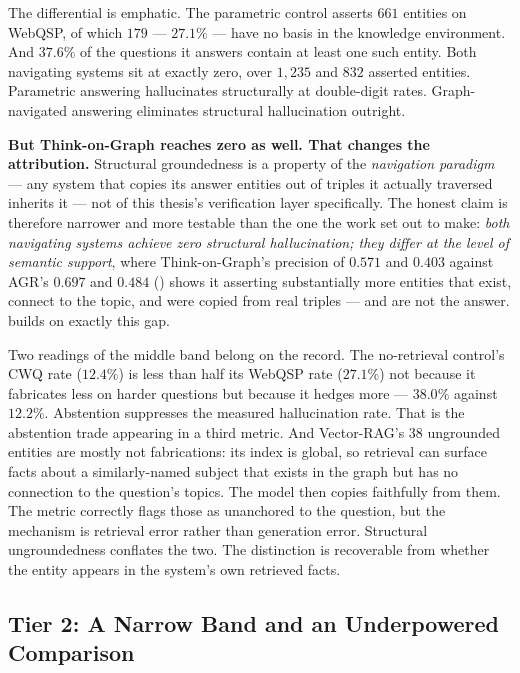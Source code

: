 The differential is emphatic. The parametric control asserts $661$ entities
on WebQSP, of which $179$ --- $27.1\%$
--- have no basis in the knowledge environment. And $37.6\%$ of the questions it
answers contain at least one such entity. Both navigating systems sit at exactly
zero, over $1{,}235$ and $832$ asserted entities. Parametric answering
hallucinates structurally at double-digit rates. Graph-navigated answering
eliminates structural hallucination outright.

\textbf{But Think-on-Graph reaches zero as well. That changes the
attribution.} Structural groundedness is a property of the \emph{navigation
paradigm} --- any system that copies its answer entities out of triples it
actually traversed inherits it --- not of this thesis's verification layer
specifically. The honest claim is therefore narrower and more testable than the
one the work set out to make: \emph{both navigating systems achieve zero
structural hallucination; they differ at the level of semantic support}, where
Think-on-Graph's precision of $0.571$ and $0.403$ against AGR's $0.697$ and
$0.484$ () shows it asserting substantially more entities that
exist, connect to the topic, and were copied from real triples --- and are not
the answer.  builds on exactly this gap.

Two readings of the middle band belong on the record. The no-retrieval control's
CWQ rate ($12.4\%$) is less than half its WebQSP rate ($27.1\%$) not because it
fabricates less on harder questions but because it hedges more --- $38.0\%$
against $12.2\%$. Abstention suppresses the measured hallucination rate.
That is the abstention trade appearing in a third metric. And Vector-RAG's $38$
ungrounded entities are mostly not fabrications: its index is global, so
retrieval can surface facts about a similarly-named subject that exists in the
graph but has no connection to the question's topics. The model then copies
faithfully from them. The metric correctly flags those as unanchored to the
question, but the mechanism is retrieval error rather than generation error.
Structural ungroundedness conflates the two. The distinction is recoverable
from whether the entity appears in the system's own retrieved facts.

\subsection{Tier 2: A Narrow Band and an Underpowered Comparison}

